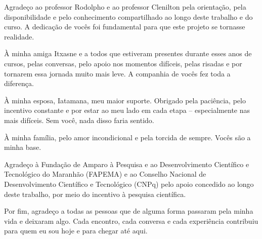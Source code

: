 

\begin{agradecimentos}
Agradeço ao professor Rodolpho e ao professor Clenilton pela orientação, pela disponibilidade e pelo conhecimento compartilhado ao longo deste trabalho e do curso. A dedicação de vocês foi fundamental para que este projeto se tornasse realidade. 

À minha amiga Itxasne e a todos que estiveram presentes durante esses anos de cursos, pelas conversas, pelo apoio nos momentos difíceis, pelas risadas e por tornarem essa jornada muito mais leve. A companhia de vocês fez toda a diferença. 

À minha esposa, Iatamana, meu maior suporte. Obrigado pela paciência, pelo incentivo constante e por estar ao meu lado em cada etapa – especialmente nas mais difíceis. Sem você, nada disso faria sentido.  

À minha família, pelo amor incondicional e pela torcida de sempre. Vocês são a minha base. 

Agradeço à Fundação de Amparo à Pesquisa e ao Desenvolvimento Científico e Tecnológico do Maranhão (FAPEMA) e ao Conselho Nacional de Desenvolvimento Científico e Tecnológico (CNPq) pelo apoio concedido ao longo deste trabalho, por meio do incentivo à pesquisa científica.

Por fim, agradeço a todas as pessoas que de alguma forma passaram pela minha vida e deixaram algo. Cada encontro, cada conversa e cada experiência contribuiu para quem eu sou hoje e para chegar até aqui. 

\end{agradecimentos}



